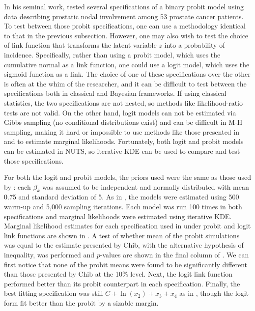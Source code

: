 \documentclass[twocolumn]{article}
\begin{document}


In his seminal work, \cite{Chib} tested several specifications of a binary probit model using data describing prostatic nodal involvement among 53 prostate cancer patients. To test between those probit specifications, one can use a methodology identical to that in the previous subsection. However, one may also wish to test the choice of link function that transforms the latent variable $z$ into a probability of incidence. Specifically, rather than using a probit model, which uses the cumulative normal as a link function, one could use a logit model, which uses the sigmoid function as a link. The choice of one of these specifications over the other is often at the whim of the researcher, and it can be difficult to test between the specifications both in classical and Bayesian frameworks. If using classical statistics, the two specifications are not nested, so methods like likelihood-ratio tests are not valid. On the other hand, logit models can not be estimated via Gibbs sampling (no conditional distributions exist) and can be difficult in M-H sampling, making it hard or impossible to use methods like those presented in \cite{Chib} and \cite{ChibJeliazkov} to estimate marginal likelihoods. Fortunately, both logit and probit models can be estimated in NUTS, so iterative KDE can be used to compare and test those specifications.

For both the logit and probit models, the priors used were the same as those used by \cite{Chib}: each $\beta_k$ was assumed to be independent and normally distributed with mean 0.75 and standard deviation of 5. As in \cite{Chib}, the models were estimated using 500 warm-up and 5,000 sampling iterations. Each model was run 100 times in both specifications and marginal likelihoods were estimated using iterative KDE. Marginal likelihood estimates for each specification used in \cite{Chib} under probit and logit link functions are shown in . A test of whether mean of the probit simulations was equal to the estimate presented by Chib, with the alternative hypothesis of inequality, was performed and $p$-values are shown in the final column of . We can first notice that none of the probit means were found to be significantly different than those presented by Chib at the 10\% level. Next, the logit link function performed better than its probit counterpart in each specification. Finally, the best fitting specification was still $C + \ln(x_2) + x_3 + x_4$ as in \cite{Chib}, though the logit form fit better than the probit by a sizable margin.
\end{document}
